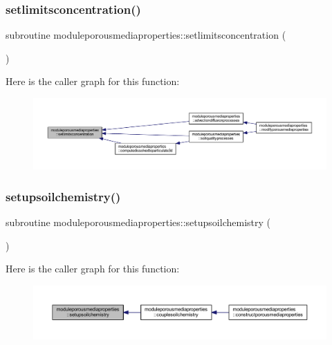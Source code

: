 \subsubsection{\texorpdfstring{setlimitsconcentration()}{setlimitsconcentration()}}
{\footnotesize\ttfamily subroutine moduleporousmediaproperties\+::setlimitsconcentration (\begin{DoxyParamCaption}{ }\end{DoxyParamCaption})\hspace{0.3cm}{\ttfamily [private]}}

Here is the caller graph for this function\+:\nopagebreak
\begin{figure}[H]
\begin{center}
\leavevmode
\includegraphics[width=350pt]{namespacemoduleporousmediaproperties_aa132ced55703c339565649a0065925da_icgraph}
\end{center}
\end{figure}
\mbox{\label{namespacemoduleporousmediaproperties_a3cc1f6f3ccfd4d997cac22737bc1093f}} 
\subsubsection{\texorpdfstring{setupsoilchemistry()}{setupsoilchemistry()}}
{\footnotesize\ttfamily subroutine moduleporousmediaproperties\+::setupsoilchemistry (\begin{DoxyParamCaption}{ }\end{DoxyParamCaption})\hspace{0.3cm}{\ttfamily [private]}}

Here is the caller graph for this function\+:\nopagebreak
\begin{figure}[H]
\begin{center}
\leavevmode
\includegraphics[width=350pt]{namespacemoduleporousmediaproperties_a3cc1f6f3ccfd4d997cac22737bc1093f_icgraph}
\end{center}
\end{figure}
\mbox{\label{namespacemoduleporousmediaproperties_aa2e7bcc28c7132e8ea2228f7f1e227d2}} 
